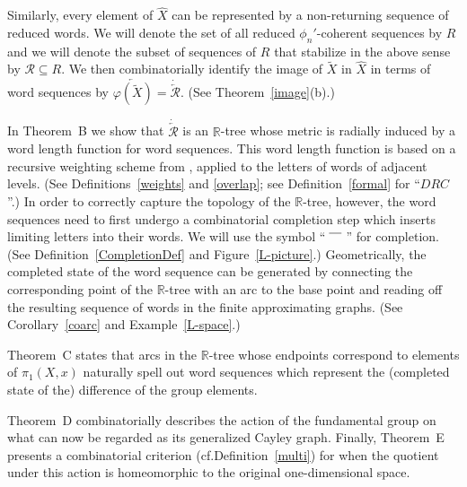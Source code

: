 \documentclass{amsart}
\theoremstyle{definition}
\theoremstyle{remark}
\numberwithin{equation}{section}
\begin{document}
Similarly, every element of $\hat{X}$ can be represented by a non-returning sequence of reduced words. We will denote the set of all reduced $\phi_n'$-coherent sequences by $R$ and we will  denote the subset of sequences of $R$ that stabilize in the above sense by ${\mathcal R}\subseteq R$. We then combinatorially identify the image of $\tilde{X}$ in $\hat{X}$ in terms of word sequences by $\overleftarrow{\varphi(\tilde{X})}=\dot{\overleftarrow{\mathcal R}}$. (See Theorem~\ref{image}(b).)

In Theorem~B  we show that $\dot{\overleftarrow{\mathcal R}}$ is an $\mathbb{R}$-tree whose metric is radially induced by a word length function for word sequences. This word length function is based on a  recursive weighting scheme from \cite{MO}, applied to the letters of words of adjacent levels. (See Definitions~\ref{weights} and \ref{overlap}; see Definition~\ref{formal} for ``$DRC$''.) In order to correctly capture the topology of the $\mathbb{R}$-tree, however, the word sequences need to first undergo a combinatorial completion step which inserts limiting letters into their words. We will use the symbol ``$\;\overline{\mbox{\raisebox{5pt}{\hspace{10pt}}}}\;$'' for completion. (See Definition~\ref{CompletionDef} and Figure~\ref{L-picture}.)
Geometrically, the completed state of the word sequence can be generated by connecting the corresponding point of the $\mathbb{R}$-tree with an arc to the base point and reading off the resulting sequence of words in the finite approximating graphs. (See Corollary~\ref{coarc} and Example~\ref{L-space}.)

Theorem~C states that arcs in the $\mathbb{R}$-tree whose endpoints correspond to elements of $\pi_1(X,x)$ naturally spell out word sequences which represent the (completed state of the) difference of the group elements.

 Theorem~D combinatorially describes the action of the fundamental group on what can now be regarded as its generalized Cayley graph.
Finally, Theorem~E  presents a combinatorial criterion (cf.\@ Definition~\ref{multi}) for when the quotient under this action is homeomorphic to the original one-dimensional space.
\end{document}
